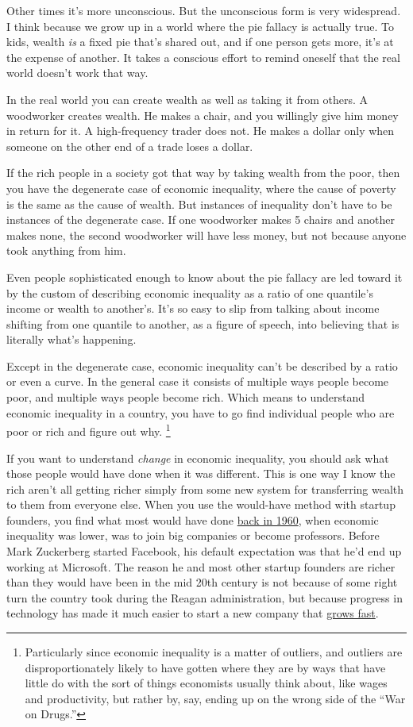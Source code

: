 \documentclass[12pt]{book}
\begin{document}
Other times it's more unconscious. But the unconscious form is very
widespread. I think because we grow up in a world where the pie fallacy
is actually true. To kids, wealth \emph{is} a fixed pie that's shared
out, and if one person gets more, it's at the expense of another. It
takes a conscious effort to remind oneself that the real world doesn't
work that way.

In the real world you can create wealth as well as taking it from
others. A woodworker creates wealth. He makes a chair, and you willingly
give him money in return for it. A high-frequency trader does not. He
makes a dollar only when someone on the other end of a trade loses a
dollar.

If the rich people in a society got that way by taking wealth from the
poor, then you have the degenerate case of economic inequality, where
the cause of poverty is the same as the cause of wealth. But instances
of inequality don't have to be instances of the degenerate case. If one
woodworker makes 5 chairs and another makes none, the second woodworker
will have less money, but not because anyone took anything from him.

Even people sophisticated enough to know about the pie fallacy are led
toward it by the custom of describing economic inequality as a ratio of
one quantile's income or wealth to another's. It's so easy to slip from
talking about income shifting from one quantile to another, as a figure
of speech, into believing that is literally what's happening.

Except in the degenerate case, economic inequality can't be described by
a ratio or even a curve. In the general case it consists of multiple
ways people become poor, and multiple ways people become rich. Which
means to understand economic inequality in a country, you have to go
find individual people who are poor or rich and figure out why.
\footnote{Particularly since economic inequality is a matter of outliers,
and outliers are disproportionately likely to have gotten where they are
by ways that have little do with the sort of things economists usually
think about, like wages and productivity, but rather by, say, ending up
on the wrong side of the ``War on Drugs.''}

If you want to understand \emph{change} in economic inequality, you
should ask what those people would have done when it was different. This
is one way I know the rich aren't all getting richer simply from some
new system for transferring wealth to them from everyone else. When you
use the would-have method with startup founders, you find what most
would have done \href{re.html}{back in 1960}, when economic inequality
was lower, was to join big companies or become professors. Before Mark
Zuckerberg started Facebook, his default expectation was that he'd end
up working at Microsoft. The reason he and most other startup founders
are richer than they would have been in the mid 20th century is not
because of some right turn the country took during the Reagan
administration, but because progress in technology has made it much
easier to start a new company that \href{growth.html}{grows fast}.
\end{document}
